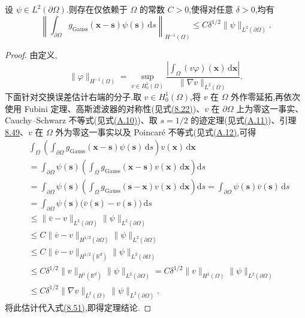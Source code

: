 \begin{theorem}
\label{thm:gaussian-commutation-Hminus1}
设 $\psi\in L^2(\partial\Omega)$.则存在仅依赖于 $\Omega$ 的常数 $C>0$,使得对任意 $\delta>0$,均有
\begin{equation}\label{eq:commutation-Hminus1-estimate}
 \left\|\int_{\partial\Omega}
   g_{\mathrm{Gauss}}(\bm{x}-\bm{s})\psi(\bm{s})\,\mathrm{d}s
  \right\|_{H^{-1}(\Omega)}
  \le C\delta^{1/2}\|\psi\|_{L^2(\partial\Omega)}.
\end{equation}
\end{theorem}
\begin{proof}
由定义,
\begin{equation}\label{eq:Hminus1-dual-norm}
 \|\varphi\|_{H^{-1}(\Omega)}
  =\sup_{v\in H_0^1(\Omega)}
     \frac{\left|\int_\Omega(v\varphi)(\bm{x})\,\mathrm{d}\bm{x}\right|}
          {\|\nabla v\|_{L^2(\Omega)}}.
\end{equation}
下面针对交换误差估计右端的分子.取 $v\in H_0^1(\Omega)$,将 $v$ 在 $\Omega$ 外作零延拓,再依次使用 Fubini 定理、高斯滤波器的对称性(见式\hyperref[eq:gaussian-filter-symmetry]{(8.22)})、$v$ 在 $\partial\Omega$ 上为零这一事实、Cauchy--Schwarz 不等式(见式\hyperref[eq:appendix-a-10]{(A.10)})、取 $s=1/2$ 的迹定理(见式\hyperref[eq:appendix-a-11]{(A.11)})、引理\hyperref[lem:gaussian-filter-Hhalf]{8.49}、$v$ 在 $\Omega$ 外为零这一事实以及 Poincaré 不等式(见式\hyperref[eq:appendix-a-12]{(A.12)},可得
\[
\begin{aligned}
 &\int_\Omega\left(\int_{\partial\Omega}
     g_{\mathrm{Gauss}}(\bm{x}-\bm{s})\psi(\bm{s})\,\mathrm{d}s
   \right)v(\bm{x})\,\mathrm{d}\bm{x}\\
 &=\int_{\partial\Omega}\psi(\bm{s})
     \left(\int_\Omega g_{\mathrm{Gauss}}(\bm{x}-\bm{s})
       v(\bm{x})\,\mathrm{d}\bm{x}\right)\mathrm{d}s\\
 &=\int_{\partial\Omega}\psi(\bm{s})
     \left(\int_\Omega g_{\mathrm{Gauss}}(\bm{s}-\bm{x})
       v(\bm{x})\,\mathrm{d}\bm{x}\right)\mathrm{d}s
   =\int_{\partial\Omega}\psi(\bm{s})\overline{v}(\bm{s})\,\mathrm{d}s\\
 &=\int_{\partial\Omega}\psi(\bm{s})
       \bigl(\overline{v}(\bm{s})-v(\bm{s})\bigr)\,\mathrm{d}s\\
 &\le \|\overline{v}-v\|_{L^2(\partial\Omega)}
       \|\psi\|_{L^2(\partial\Omega)}\\
 &\le C\|\overline{v}-v\|_{H^{1/2}(\partial\Omega)}
       \|\psi\|_{L^2(\partial\Omega)}\\
 &\le C\|\overline{v}-v\|_{H^{1/2}(\mathbb{R}^d)}
       \|\psi\|_{L^2(\partial\Omega)}\\
 &\le C\delta^{1/2}\|v\|_{H^1(\mathbb{R}^d)}
       \|\psi\|_{L^2(\partial\Omega)}
  =C\delta^{1/2}\|v\|_{H^1(\Omega)}
       \|\psi\|_{L^2(\partial\Omega)}\\
 &\le C\delta^{1/2}\|\nabla v\|_{L^2(\Omega)}
       \|\psi\|_{L^2(\partial\Omega)}.
\end{aligned}
\]
将此估计代入式\hyperref[eq:Hminus1-dual-norm]{(8.51)},即得定理结论.
\end{proof}

